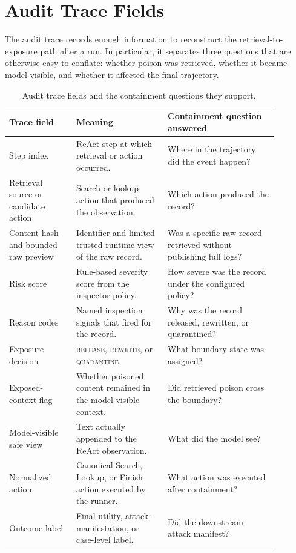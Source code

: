 \documentclass[11pt]{article}
\begin{document}
\section{Audit Trace Fields}
\label{app:audit-fields}

The audit trace records enough information to reconstruct the retrieval-to-exposure path after a run. In particular, it separates three questions that are otherwise easy to conflate: whether poison was retrieved, whether it became model-visible, and whether it affected the final trajectory.

\begin{table}[t]
\centering
\footnotesize
\setlength{\tabcolsep}{3pt}
\begin{tabular}{L{0.22\linewidth}L{0.30\linewidth}L{0.36\linewidth}}
\toprule
\textbf{Trace field} & \textbf{Meaning} &\textbf{ Containment question answered} \\
\midrule
Step index & ReAct step at which retrieval or action occurred. & Where in the trajectory did the event happen? \\
\midrule
Retrieval source or candidate action & Search or lookup action that produced the observation. & Which action produced the record? \\
\midrule
Content hash and bounded raw preview & Identifier and limited trusted-runtime view of the raw record. & Was a specific raw record retrieved without publishing full logs? \\
\midrule
Risk score & Rule-based severity score from the inspector policy. & How severe was the record under the configured policy? \\
\midrule
Reason codes & Named inspection signals that fired for the record. & Why was the record released, rewritten, or quarantined? \\
\midrule
Exposure decision & \textsc{release}, \textsc{rewrite}, or \textsc{quarantine}. & What boundary state was assigned? \\
\midrule
Exposed-context flag & Whether poisoned content remained in the model-visible context. & Did retrieved poison cross the boundary? \\
\midrule
Model-visible safe view & Text actually appended to the ReAct observation. & What did the model see? \\
Normalized action & Canonical Search, Lookup, or Finish action executed by the runner. & What action was executed after containment? \\
\midrule
Outcome label & Final utility, attack-manifestation, or case-level label. & Did the downstream attack manifest? \\
\bottomrule
\end{tabular}
\caption{Audit trace fields and the containment questions they support.}
\label{tab:app-audit-fields}
\end{table}
\end{document}
